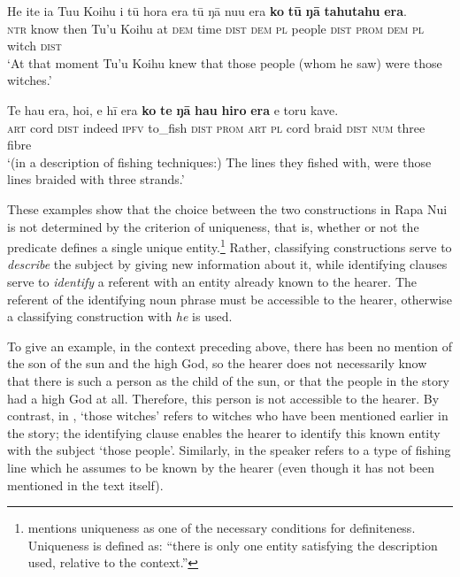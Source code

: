 \ea\label{ex:9.23}
\gll He {\ꞌ}ite ia Tu{\ꞌ}u Koihu {\ꞌ}i tū hora era tū ŋā nu{\ꞌ}u era  \textbf{ko} \textbf{tū} \textbf{ŋā} \textbf{tahutahu} \textbf{era}.\\
\textsc{ntr} know then Tu’u Koihu at \textsc{dem} time \textsc{dist} \textsc{dem} \textsc{pl} people \textsc{dist}  \textsc{prom} \textsc{dem} \textsc{pl} witch \textsc{dist}\\

\glt 
‘At that moment Tu’u Koihu knew that those people (whom he saw) were those witches.’ \textstyleExampleref{[R233.023]} 
\z

\ea\label{ex:9.24}
\gll Te hau era, ho{\ꞌ}i, e hī era \textbf{ko} \textbf{te} \textbf{ŋā} \textbf{hau} \textbf{hiro} \textbf{era} e toru kave. \\
\textsc{art} cord \textsc{dist} indeed \textsc{ipfv} to\_fish \textsc{dist} \textsc{prom} \textsc{art} \textsc{pl} cord braid \textsc{dist} \textsc{num} three fibre \\

\glt
‘(in a description of fishing techniques:) The lines they fished with, were those lines braided with three strands.’ \textstyleExampleref{[R539-1.218]}
\z

These examples show that the choice between the two constructions in Rapa Nui is not determined by the criterion of uniqueness, that is, whether or not the predicate defines a single unique entity.\footnote{\label{fn:465}\citet{Lyons1999} mentions uniqueness as one of the necessary conditions for definiteness. Uniqueness is defined as: “there is only one entity satisfying the description used, relative to the context.”} Rather, classifying constructions serve to \textit{describe} the subject by giving new information about it, while identifying clauses serve to \textit{identify} a referent with an entity already known to the hearer. The referent of the identifying noun phrase must be accessible to the hearer, otherwise a classifying construction with \textit{he} is used.

To give an example, in the context preceding  above, there has been no mention of the son of the sun and the high God, so the hearer does not necessarily know that there is such a person as the child of the sun, or that the people in the story had a high God at all. Therefore, this person is not accessible to the hearer. By contrast, in , ‘those witches’ refers to witches who have been mentioned earlier in the story; the identifying clause enables the hearer to identify this known entity with the subject ‘those people’. Similarly, in  the speaker refers to a type of fishing line which he assumes to be known by the hearer (even though it has not been mentioned in the text itself).

